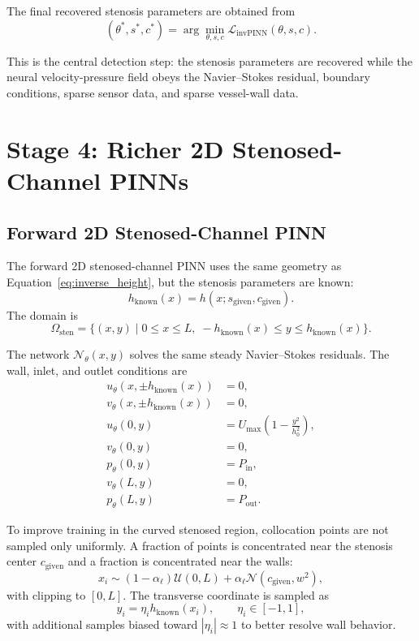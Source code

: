 \documentclass[11pt]{article}
\begin{document}
The final recovered stenosis parameters are obtained from
\begin{equation}
    (\theta^{\ast},s^{\ast},c^{\ast})
    =
    \arg\min_{\theta,s,c}
    \mathcal{L}_{\mathrm{invPINN}}(\theta,s,c).
\end{equation}

This is the central detection step: the stenosis parameters are recovered while the neural velocity-pressure field obeys the Navier--Stokes residual, boundary conditions, sparse sensor data, and sparse vessel-wall data.

\section{Stage 4: Richer 2D Stenosed-Channel PINNs}

\subsection{Forward 2D Stenosed-Channel PINN}

The forward 2D stenosed-channel PINN uses the same geometry as Equation~\eqref{eq:inverse_height}, but the stenosis parameters are known:
\begin{equation}
    h_{\mathrm{known}}(x)
    =
    h(x;s_{\mathrm{given}},c_{\mathrm{given}}).
\end{equation}
The domain is
\begin{equation}
    \Omega_{\mathrm{sten}}
    =
    \{(x,y)\mid 0\le x\le L,\; -h_{\mathrm{known}}(x)\le y\le h_{\mathrm{known}}(x)\}.
\end{equation}

The network $\mathcal{N}_{\theta}(x,y)$ solves the same steady Navier--Stokes residuals. The wall, inlet, and outlet conditions are
\begin{align}
    u_{\theta}(x,\pm h_{\mathrm{known}}(x))&=0,\\
    v_{\theta}(x,\pm h_{\mathrm{known}}(x))&=0,\\
    u_{\theta}(0,y)
    &=
    U_{\max}
    \left(
        1-\frac{y^2}{h_0^2}
    \right),\\
    v_{\theta}(0,y)&=0,\\
    p_{\theta}(0,y)&=P_{\mathrm{in}},\\
    v_{\theta}(L,y)&=0,\\
    p_{\theta}(L,y)&=P_{\mathrm{out}}.
\end{align}

To improve training in the curved stenosed region, collocation points are not sampled only uniformly. A fraction of points is concentrated near the stenosis center $c_{\mathrm{given}}$ and a fraction is concentrated near the walls:
\begin{equation}
    x_i
    \sim
    (1-\alpha_{\ell})\mathcal{U}(0,L)
    +
    \alpha_{\ell}
    \mathcal{N}(c_{\mathrm{given}},w^2),
\end{equation}
with clipping to $[0,L]$. The transverse coordinate is sampled as
\begin{equation}
    y_i=\eta_i h_{\mathrm{known}}(x_i),
    \qquad
    \eta_i\in[-1,1],
\end{equation}
with additional samples biased toward $|\eta_i|\approx 1$ to better resolve wall behavior.
\end{document}
